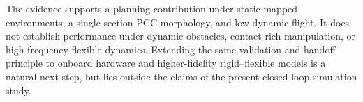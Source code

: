 \documentclass[journal,twoside]{IEEEtran}
\begin{document}
The evidence supports a planning contribution under static mapped environments, a single-section PCC morphology, and low-dynamic flight. It does not establish performance under dynamic obstacles, contact-rich manipulation, or high-frequency flexible dynamics. Extending the same validation-and-handoff principle to onboard hardware and higher-fidelity rigid--flexible models is a natural next step, but lies outside the claims of the present closed-loop simulation study.

\balance


\end{document}
